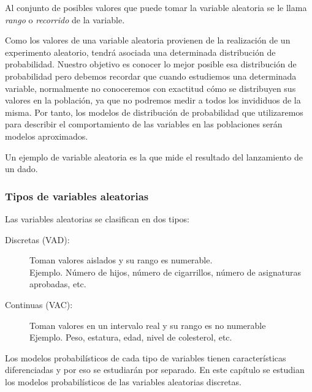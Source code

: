 \begin{frame}
{\begin{definicion}
Al conjunto de posibles valores que puede tomar la variable aleatoria se le llama \emph{rango} o \emph{recorrido} de la variable.
\end{definicion}

Como los valores de una variable aleatoria provienen de la realización de un experimento aleatorio, 
tendrá asociada una determinada distribución de probabilidad. Nuestro objetivo es conocer lo mejor posible esa distribución de probabilidad
pero debemos recordar que cuando estudiemos una determinada variable,
normalmente no conoceremos con exactitud cómo se distribuyen sus valores en la población, ya que no podremos medir a todos los invididuos de
la misma. Por tanto, los modelos de distribución de probabilidad que utilizaremos para describir el comportamiento de las variables en las
poblaciones serán modelos aproximados. 

Un ejemplo de variable aleatoria es la que mide el resultado del lanzamiento de un dado.
}
\end{frame}


\begin{frame}
\frametitle{Tipos de variables aleatorias}
Las variables aleatorias se clasifican en dos tipos:
\begin{description}
\item[Discretas (VAD):] Toman valores aislados y su rango es numerable.\\
Ejemplo. Número de hijos, número de cigarrillos, número de asignaturas aprobadas, etc. 
\item[Continuas (VAC):] Toman valores en un intervalo real y su rango es no numerable\\
Ejemplo. Peso, estatura, edad, nivel de colesterol, etc. 
\end{description}

Los modelos probabilísticos de cada tipo de variables tienen características diferenciadas y por eso se estudiarán por separado. 
En este capítulo se estudian los modelos probabilísticos de las variables aleatorias discretas.

\end{frame}


